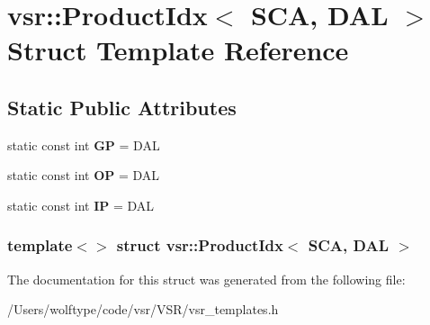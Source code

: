 \hypertarget{structvsr_1_1_product_idx_3_01_s_c_a_00_01_d_a_l_01_4}{\section{vsr\-:\-:Product\-Idx$<$ S\-C\-A, D\-A\-L $>$ Struct Template Reference}
\label{structvsr_1_1_product_idx_3_01_s_c_a_00_01_d_a_l_01_4}
}
\subsection*{Static Public Attributes}
\begin{DoxyCompactItemize}
\item 
\hypertarget{structvsr_1_1_product_idx_3_01_s_c_a_00_01_d_a_l_01_4_a551ce0aca034270dd170c9b5e1d7e56a}{static const int {\bfseries G\-P} = D\-A\-L}\label{structvsr_1_1_product_idx_3_01_s_c_a_00_01_d_a_l_01_4_a551ce0aca034270dd170c9b5e1d7e56a}

\item 
\hypertarget{structvsr_1_1_product_idx_3_01_s_c_a_00_01_d_a_l_01_4_ac32addfa590d543cd87c694aa408dd5a}{static const int {\bfseries O\-P} = D\-A\-L}\label{structvsr_1_1_product_idx_3_01_s_c_a_00_01_d_a_l_01_4_ac32addfa590d543cd87c694aa408dd5a}

\item 
\hypertarget{structvsr_1_1_product_idx_3_01_s_c_a_00_01_d_a_l_01_4_a726751bcee130d905ba2b330c8dfc938}{static const int {\bfseries I\-P} = D\-A\-L}\label{structvsr_1_1_product_idx_3_01_s_c_a_00_01_d_a_l_01_4_a726751bcee130d905ba2b330c8dfc938}

\end{DoxyCompactItemize}
\subsubsection*{template$<$$>$ struct vsr\-::\-Product\-Idx$<$ S\-C\-A, D\-A\-L $>$}



The documentation for this struct was generated from the following file\-:\begin{DoxyCompactItemize}
\item 
/\-Users/wolftype/code/vsr/\-V\-S\-R/vsr\-\_\-templates.\-h\end{DoxyCompactItemize}
